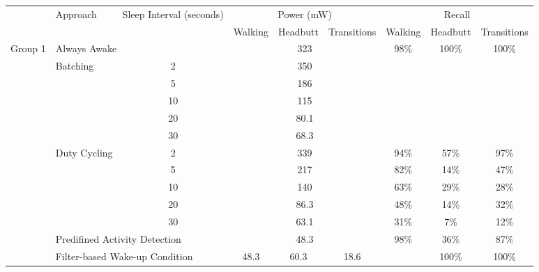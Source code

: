 \begin{table*}[t]
    \begin{tabular}{|l|l|c|c|c|c|c|c|c|}
    \hline
	\multirow{2}{*}{~}			& \multirow{2}{*}{Approach}		& \multirow{2}{*}{\parbox{2.2cm}{Sleep Interval (seconds)}}	
																						& \multicolumn{3}{c|}{Power (mW)}		& \multicolumn{3}{c|}{Recall} 													\\ \cline{4-9}
								&								&						& Walking	& Headbutt	& Transitions	& Walking				& Headbutt					& Transitions 				\\ \hline
	\multirow{14}{*}{Group 1}	& \multicolumn{2}{l|}{Always Awake}						& \multicolumn{3}{c|}{323}				& \multirow{6}{*}{98\%}	& \multirow{6}{*}{100\%}	& \multirow{6}{*}{100\%}	\\ \cline{2-6}
								& \multirow{5}{*}{Batching}		& 2						& \multicolumn{3}{c|}{350}				&						&							&							\\ \cline{3-6}
								& 								& 5						& \multicolumn{3}{c|}{186}				&						&							&							\\ \cline{3-6}
								& 								& 10					& \multicolumn{3}{c|}{115}				&						&							&							\\ \cline{3-6}
								& 								& 20					& \multicolumn{3}{c|}{80.1}				&						&							&							\\ \cline{3-6}
								& 								& 30					& \multicolumn{3}{c|}{68.3}				&						&							&							\\ \cline{2-9}
								& \multirow{5}{*}{Duty Cycling}	& 2						& \multicolumn{3}{c|}{339}				& 94\%					& 57\%						& 97\%						\\ \cline{3-9}
								& 								& 5						& \multicolumn{3}{c|}{217}				& 82\%					& 14\%						& 47\%						\\ \cline{3-9}
								& 								& 10					& \multicolumn{3}{c|}{140}				& 63\%					& 29\%						& 28\%						\\ \cline{3-9}
								& 								& 20					& \multicolumn{3}{c|}{86.3}				& 48\%					& 14\%						& 32\%						\\ \cline{3-9}
								& 								& 30					& \multicolumn{3}{c|}{63.1}				& 31\%					& 7\%						& 12\%						\\ \cline{2-9}
								& \multicolumn{2}{l|}{Predifined Activity Detection}	& \multicolumn{3}{c|}{48.3}				& \multirow{3}{*}{98\%}	& 36\%						& 87\%						\\ \cline{2-6}\cline{8-9}
								& \multicolumn{2}{l|}{Filter-based Wake-up Condition}	& 48.3		& 60.3		& 18.6			& 						& \multirow{2}{*}{100\%}	& \multirow{2}{*}{100\%}	\\ \cline{2-6}

\end{tabular}
\end{table*}
